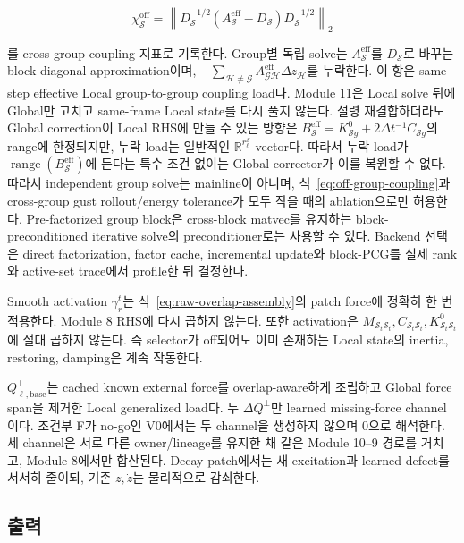 \documentclass[11pt,a4paper]{article}
\newcommand{\R}{\mathbb{R}}
\begin{document}
\begin{equation}
  \chi_{\mathcal S}^{\mathrm{off}}
  =
  \left\|
  D_{\mathcal S}^{-1/2}
  \left(A_{\mathcal S}^{\mathrm{eff}}-D_{\mathcal S}\right)
  D_{\mathcal S}^{-1/2}
  \right\|_2
  \label{eq:off-group-coupling}
\end{equation}

를 cross-group coupling 지표로 기록한다.
Group별 독립 solve는 \(A_{\mathcal S}^{\mathrm{eff}}\)를
\(D_{\mathcal S}\)로 바꾸는 block-diagonal approximation이며,
\(-\sum_{\mathcal H\ne\mathcal G}A_{\mathcal G\mathcal H}^{\mathrm{eff}}
\Delta z_{\mathcal H}\)를 누락한다.
이 항은 same-step effective Local group-to-group coupling load다.
Module 11은 Local solve 뒤에 Global만 고치고 same-frame Local state를 다시 풀지 않는다.
설령 재결합하더라도 Global correction이 Local RHS에 만들 수 있는 방향은
\(B_{\mathcal S}^{\mathrm{eff}}
=K_{\mathcal Sg}^{0}+2\Delta t^{-1}C_{\mathcal Sg}\)의 range에 한정되지만,
누락 load는 일반적인 \(\R^{r_\ell^{\mathcal S}}\) vector다.
따라서 누락 load가 \(\operatorname{range}(B_{\mathcal S}^{\mathrm{eff}})\)에 든다는
특수 조건 없이는 Global corrector가 이를 복원할 수 없다.
따라서 independent group solve는 mainline이 아니며,
식~\eqref{eq:off-group-coupling}과 cross-group gust rollout/energy tolerance가 모두 작을 때의 ablation으로만 허용한다.
Pre-factorized group block은 cross-block matvec를 유지하는 block-preconditioned iterative solve의
preconditioner로는 사용할 수 있다. Backend 선택은 direct factorization, factor cache,
incremental update와 block-PCG를 실제 rank와 active-set trace에서 profile한 뒤 결정한다.

Smooth activation \(\gamma_r^t\)는 식~\eqref{eq:raw-overlap-assembly}의
patch force에 정확히 한 번 적용한다. Module 8 RHS에 다시 곱하지 않는다.
또한 activation은 \(M_{\mathcal S_t\mathcal S_t},C_{\mathcal S_t\mathcal S_t},
K_{\mathcal S_t\mathcal S_t}^{0}\)에 절대 곱하지 않는다.
즉 selector가 off되어도 이미 존재하는 Local state의 inertia, restoring, damping은 계속 작동한다.

\(Q_{\ell,\mathrm{base}}^{\perp}\)는 cached known external force를 overlap-aware하게 조립하고
Global force span을 제거한 Local generalized load다.
두 \(\Delta Q^\perp\)만 learned missing-force channel이다.
조건부 F가 no-go인 V0에서는 두 channel을 생성하지 않으며 0으로 해석한다.
세 channel은 서로 다른 owner/lineage를 유지한 채 같은 Module 10--9 경로를 거치고,
Module 8에서만 합산된다.
Decay patch에서는 새 excitation과 learned defect를 서서히 줄이되,
기존 \(z,\dot z\)는 물리적으로 감쇠한다.

\subsection*{출력}
\end{document}
